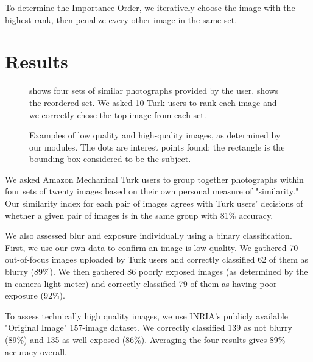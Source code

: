 \documentclass{sig-alternate}
\begin{document}
To determine the Importance Order, we iteratively choose the image with the highest rank, then penalize every other image in the same set.

\section{Results}

\begin{figure*}[t!]
\centering
{}
\caption{ shows four sets of similar photographs provided by the user.  shows the reordered set. We asked 10 Turk users to rank each image and we correctly chose the top image from each set.}
\label{fig:ResultSorting}
\end{figure*}

\begin{figure*}[t!]
\centering
{}
\caption{Examples of  low quality and  high-quality images, as determined by our modules. The dots are interest points found; the rectangle is the bounding box considered to be the subject.}
\label{fig:Examples}
\end{figure*}

We asked Amazon Mechanical Turk users to group together photographs within four sets of twenty images based on their own personal measure of "similarity." Our similarity index for each pair of images agrees with Turk users' decisions of whether a given pair of images is in the same group with 81\% accuracy.

We also assessed blur and exposure individually using a binary classification. First, we use our own data to confirm an image is low quality. We gathered 70 out-of-focus images uploaded by Turk users and correctly classified 62 of them as blurry (89\%). We then gathered 86 poorly exposed images (as determined by the in-camera light meter) and correctly classified 79 of them as having poor exposure (92\%).

To assess technically high quality images, we use INRIA's publicly available "Original Image" 157-image dataset\cite{JDS08}.  We correctly classified 139 as not blurry (89\%) and 135 as well-exposed (86\%). Averaging the four results gives 89\% accuracy overall.
\end{document}
